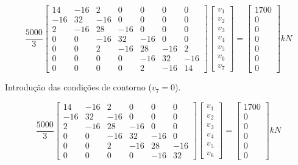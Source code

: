 \documentclass{article} %
\begin{document}
\begin{equation*}
\frac{5000}{3}\begin{bmatrix}
14& -16& 2& 0& 0& 0& 0\\
-16& 32& -16& 0& 0& 0& 0\\
2&-16& 28& -16& 0& 0& 0\\
0&0&-16&32& -16& 0& 0\\
0&0&2&-16& 28& -16& 2\\
0&0&0&0&-16&32& -16\\
0&0&0&0&2& -16& 14
\end{bmatrix}\begin{bmatrix}
v_1\\
v_2\\
v_3\\
v_4\\
v_5\\
v_6\\
v_7
\end{bmatrix}=\begin{bmatrix}
1700\\
0\\
0\\
0\\
0\\
0\\
0
\end{bmatrix}kN
\end{equation*}

Introdução das condições de contorno (\(v_7=0\)).

\begin{equation*}
\frac{5000}{3}\begin{bmatrix}
14& -16& 2& 0& 0& 0\\
-16& 32& -16& 0& 0& 0\\
2&-16& 28& -16& 0& 0\\
0&0&-16&32& -16& 0\\
0&0&2&-16& 28& -16\\
0&0&0&0&-16&32
\end{bmatrix}\begin{bmatrix}
v_1\\
v_2\\
v_3\\
v_4\\
v_5\\
v_6
\end{bmatrix}=\begin{bmatrix}
1700\\
0\\
0\\
0\\
0\\
0
\end{bmatrix}kN
\end{equation*}
\end{document}
